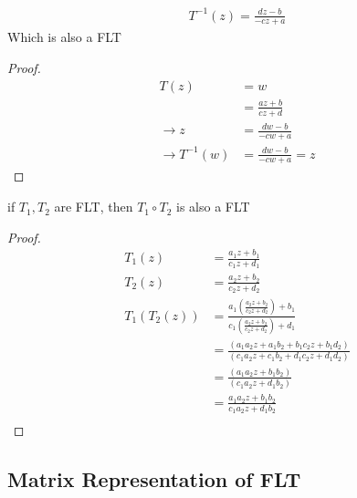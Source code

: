 \begin{claim}
    \begin{align*}
        T^{-1}(z) = \frac{dz - b}{-cz + a}
    \end{align*}
    Which is also a FLT
    \begin{proof}
        \begin{align*}
            T(z)                  & = w                          \\
                                  & = \frac{az + b}{cz + d}      \\
            \rightarrow z         & = \frac{dw - b}{-cw + a}     \\
            \rightarrow T^{-1}(w) & = \frac{dw - b}{-cw + a} = z
        \end{align*}
    \end{proof}
\end{claim}

\begin{claim}
    if $T_1, T_2$ are FLT, then $T_1 \circ T_2$ is also a FLT
    \begin{proof}
        \begin{align*}
            T_1(z)      & = \frac{a_1z + b_1}{c_1z + d_1}                                                             \\
            T_2(z)      & = \frac{a_2z + b_2}{c_2z + d_2}                                                             \\
            T_1(T_2(z)) & = \frac{a_1(\frac{a_2z + b_2}{c_2z + d_2}) + b_1}{c_1(\frac{a_2z + b_2}{c_2z + d_2}) + d_1} \\
                        & = \frac{(a_1a_2z + a_1b_2 + b_1c_2z + b_1d_2)}{(c_1a_2z + c_1b_2 + d_1c_2z + d_1d_2)}       \\
                        & = \frac{(a_1a_2z + b_1b_2)}{(c_1a_2z + d_1b_2)}                                             \\
                        & = \frac{a_1a_2z + b_1b_2}{c_1a_2z + d_1b_2}                                                 \\
        \end{align*}
    \end{proof}
\end{claim}

\subsection{Matrix Representation of FLT}

